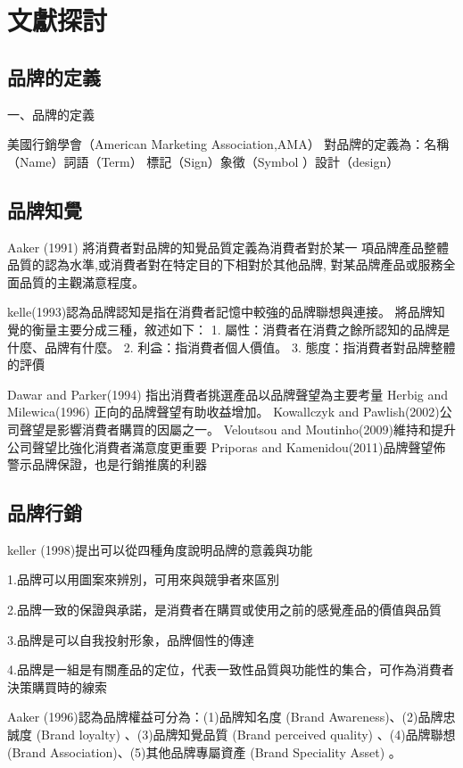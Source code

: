 \chapter{文獻探討}


\section{品牌的定義}

一、品牌的定義

美國行銷學會\cite{AMA}（American Marketing Association,AMA）
對品牌的定義為：名稱 （Name）詞語（Term） 標記（Sign）象徵（Symbol ）設計（design）


\section{品牌知覺}
Aaker (1991) 將消費者對品牌的知覺品質定義為消費者對於某一 項品牌產品整體品質的認為水準,或消費者對在特定目的下相對於其他品牌, 對某品牌產品或服務全面品質的主觀滿意程度。\cite{Aaker,1991}

kelle(1993)認為品牌認知是指在消費者記憶中較強的品牌聯想與連接。\cite{Keller,1993}
將品牌知覺的衡量主要分成三種，敘述如下：
1. 屬性：消費者在消費之餘所認知的品牌是什麼、品牌有什麼。
2. 利益：指消費者個人價值。
3. 態度：指消費者對品牌整體的評價

Dawar and Parker(1994) 指出消費者挑選產品以品牌聲望為主要考量
Herbig and Milewica(1996) 正向的品牌聲望有助收益增加。
Kowallczyk and Pawlish(2002)公司聲望是影響消費者購買的因屬之一。
Veloutsou and Moutinho(2009)維持和提升公司聲望比強化消費者滿意度更重要
Priporas and Kamenidou(2011)品牌聲望佈警示品牌保證，也是行銷推廣的利器
\section{品牌行銷}

keller (1998)提出可以從四種角度說明品牌的意義與功能\cite{Keller,1998}

1.品牌可以用圖案來辨別，可用來與競爭者來區別

2.品牌一致的保證與承諾，是消費者在購買或使用之前的感覺產品的價值與品質

3.品牌是可以自我投射形象，品牌個性的傳達

4.品牌是一組是有關產品的定位，代表一致性品質與功能性的集合，可作為消費者決策購買時的線索

Aaker (1996)認為品牌權益可分為：(1)品牌知名度 (Brand Awareness)、(2)品牌忠誠度 (Brand loyalty) 、(3)品牌知覺品質 (Brand perceived quality) 、(4)品牌聯想 (Brand Association)、(5)其他品牌專屬資產 (Brand Speciality Asset) 。\cite{Aaker,1996}

